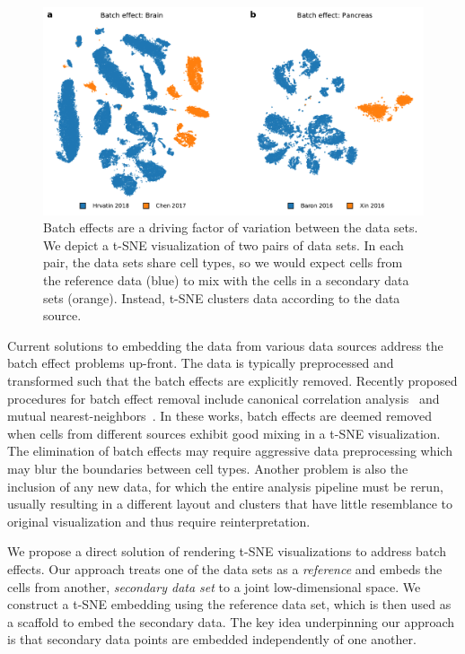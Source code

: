 \documentclass[runningheads]{llncs}
\begin{document}
\begin{figure}[htbp]
  \includegraphics[width=\textwidth]{figures/batch_effect.pdf}
  \caption{Batch effects are a driving factor of variation between the data
  sets. We depict a t-SNE visualization of two pairs of data sets. In each
  pair, the data sets share cell types, so we would expect cells
  from the reference data (blue) to mix with the cells in a secondary data
  sets (orange). Instead, t-SNE clusters data according to the
  data source.}
  \label{fig:batch_effect}
\end{figure}

Current solutions to embedding the data from various data sources address the
batch effect problems up-front. The data is typically preprocessed and
transformed such that the batch effects are explicitly removed. Recently
proposed procedures for batch effect removal include canonical correlation
analysis~\cite{cca} and mutual nearest-neighbors~\cite{mnn,seurat}.  In these
works, batch effects are deemed removed when cells from different sources
exhibit good mixing in a t-SNE visualization.  The elimination of batch effects
may require aggressive data preprocessing which may blur the boundaries between
cell types. Another problem is also the inclusion of any new data, for which
the entire analysis pipeline must be rerun, usually resulting in a different
layout and clusters that have little resemblance to original visualization and
thus require reinterpretation.

We propose a direct solution of rendering t-SNE visualizations to address
batch effects. Our approach treats one of the data sets as a {\em reference}
and embeds the cells from another, {\em secondary data set} to a joint
low-dimensional space.  We construct a t\nobreakdash -SNE embedding using the
reference data set, which is then used as a scaffold to embed the
secondary data. The key idea underpinning our approach is that secondary data
points are embedded independently of one another.
\end{document}
